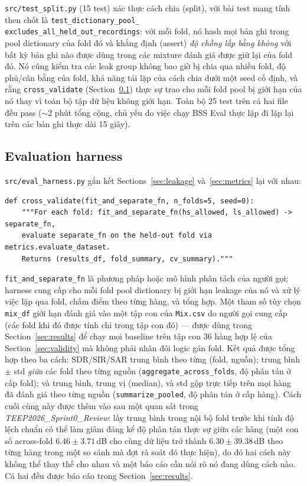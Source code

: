 \documentclass[11pt]{article}
\begin{document}
\texttt{src/test\_split.py} (15 test) xác thực cách chia (split), với bài
test mang tính then chốt là \texttt{test\_dictionary\_pool\_} \\
\texttt{excludes\_all\_held\_out\_recordings}: với mỗi fold, nó hash mọi
bản ghi trong pool dictionary của fold đó và khẳng định (assert) \emph{độ
chồng lấp bằng không} với bất kỳ bản ghi nào được dùng trong các mixture
đánh giá được giữ lại của fold đó. Nó cũng kiểm tra các leak group không
bao giờ bị chia qua nhiều fold, độ phủ/cân bằng của fold, khả năng tái
lặp của cách chia dưới một seed cố định, và rằng \texttt{cross\_validate}
(Section~\ref{sec:harness}) thực sự trao cho mỗi fold pool bị giới hạn
của nó thay vì toàn bộ tập dữ liệu không giới hạn. Toàn bộ 25 test trên
cả hai file đều pass ($\sim$2 phút tổng cộng, chủ yếu do việc chạy BSS
Eval thực lặp đi lặp lại trên các bản ghi thực dài 15 giây).

\subsection{Evaluation harness}
\label{sec:harness}

\texttt{src/eval\_harness.py} gắn kết Sections~\ref{sec:leakage}
và~\ref{sec:metrics} lại với nhau:

\begin{lstlisting}
def cross_validate(fit_and_separate_fn, n_folds=5, seed=0):
    """For each fold: fit_and_separate_fn(hs_allowed, ls_allowed) -> separate_fn,
    evaluate separate_fn on the held-out fold via metrics.evaluate_dataset.
    Returns (results_df, fold_summary, cv_summary)."""
\end{lstlisting}

\texttt{fit\_and\_separate\_fn} là phương pháp hoặc mô hình phân tách của
người gọi; harness cung cấp cho mỗi fold pool dictionary bị giới hạn
leakage của nó và xử lý việc lặp qua fold, chấm điểm theo từng hàng, và
tổng hợp. Một tham số tùy chọn \texttt{mix\_df} giới hạn đánh giá vào một
tập con của \texttt{Mix.csv} do người gọi cung cấp (các fold khi đó được
tính chỉ trong tập con đó) --- được dùng trong Section~\ref{sec:results}
để chạy mọi baseline trên tập con 36 hàng hợp lệ của
Section~\ref{sec:validity} mà không phải nhân đôi logic gán fold. Kết quả
được tổng hợp theo ba cách: SDR/SIR/SAR trung bình theo từng (fold,
nguồn); trung bình $\pm$ std \emph{giữa} các fold theo từng nguồn
(\texttt{aggregate\_across\_folds}, độ phân tán ở cấp fold); và trung
bình, trung vị (median), và std gộp trực tiếp trên mọi hàng đã đánh giá
theo từng nguồn (\texttt{summarize\_pooled}, độ phân tán ở cấp hàng). Cách
cuối cùng này được thêm vào sau một quan sát trong
\emph{TEEP2026\_Sprint0\_Review}: lấy trung bình trong nội bộ fold trước
khi tính độ lệch chuẩn có thể làm giảm đáng kể độ phân tán thực sự giữa
các hàng (một con số across-fold $6.46\pm3.71$\,dB cho cùng dữ liệu trở
thành $6.30\pm39.38$\,dB theo từng hàng trong một so sánh mà đợt rà soát
đó thực hiện), do đó hai cách này không thể thay thế cho nhau và một báo
cáo cần nói rõ nó đang dùng cách nào. Cả hai đều được báo cáo trong
Section~\ref{sec:results}.
\end{document}
